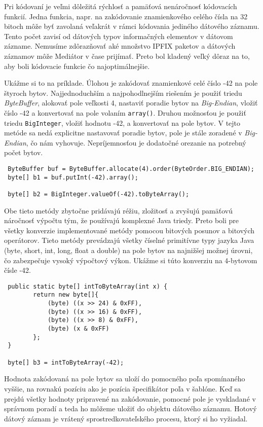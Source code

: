 Pri kódovaní je veľmi dôležitá rýchlosť a pamäťová 
nenáročnosť kódovacích funkcií. Jedna funkcia, napr. na zakódovanie znamienkového celého čísla na 32
bitoch môže byť zavolaná veľakrát v rámci kódovania jediného dátového záznamu. Tento počet zavisí od 
dátových typov informačných elementov v dátovom zázname. Nemusíme zdôrazňovať aké množstvo IPFIX paketov 
a dátových záznamov môže Mediátor v čase prijímať. Preto bol kladený veľký dôraz na to, aby boli 
kódovacie funkcie čo najoptimálnejšie. 

Ukážme si to na príklade. Úlohou je zakódovať znamienkové celé číslo -42 na pole štyroch bytov.
Najjednoduchším a najpohodlnejším riešením je použiť triedu \emph{ByteBuffer}, alokovať pole veľkosti 
4, nastaviť poradie bytov na \emph{Big-Endian}, vložiť číslo -42 a konvertovať na pole 
volaním \verb|array()|. Druhou možnosťou je použiť triedu \verb|BigInteger|, vložiť hodnotu -42, 
a konvertovať na pole bytov. V tejto metóde sa nedá explicitne nastavovať poradie bytov, pole 
je stále zoradené v \emph{Big-Endian}, čo nám vyhovuje. Nepríjemnosťou je dodatočné orezanie na 
potrebný počet bytov. 
\begin{verbatim}
 ByteBuffer buf = ByteBuffer.allocate(4).order(ByteOrder.BIG_ENDIAN);
 byte[] b1 = buf.putInt(-42).array();
 
 byte[] b2 = BigInteger.valueOf(-42).toByteArray();
\end{verbatim}
Obe tieto metódy zbytočne pridávajú réžiu, zložitosť a zvyšujú pamäťovú náročnosť výpočtu tým, že 
používajú komplexné Java triedy. Preto boli pre všetky konverzie implementované metódy pomocou bitových
posunov a bitových operátorov. Tieto metódy prevádzajú všetky číselné primitívne typy jazyka Java 
(byte, short, int, long, float a double) na pole bytov na najnižšej možnej úrovni, čo zabezpečuje vysoký
výpočtový výkon. Ukážme si túto konverziu na 4-bytovom čísle -42.
\begin{verbatim}
 public static byte[] intToByteArray(int x) {
        return new byte[]{
            (byte) ((x >> 24) & 0xFF),
            (byte) ((x >> 16) & 0xFF),
            (byte) ((x >> 8) & 0xFF),
            (byte) (x & 0xFF)
        };
 }
 
 byte[] b3 = intToByteArray(-42);
\end{verbatim}

Hodnota zakódovaná na pole bytov sa uloží do pomocného poľa spomínaného vyššie, na rovnakú pozíciu
ako je pozícia špecifikátor poľa v šablóne. Keď sa prejdú všetky hodnoty pripravené na zakódovanie, 
pomocné pole je vyskladané v správnom poradí a teda ho môžeme uložiť do objektu dátového záznamu.
Hotový dátový záznam je vrátený sprostredkovateľského procesu, ktorý si ho vyžiadal.


